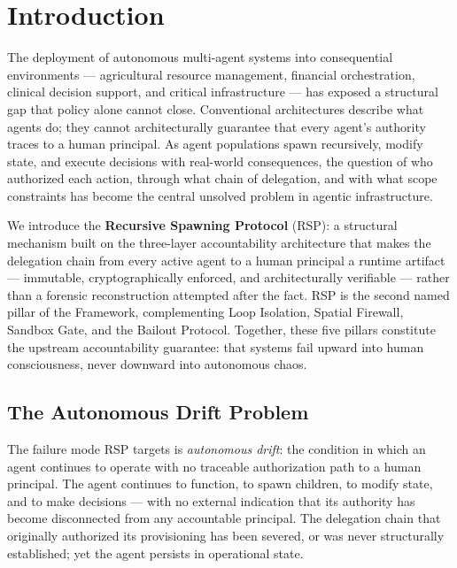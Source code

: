 \section{Introduction}
\label{sec:rs-intro}

The deployment of autonomous multi-agent systems into consequential environments — agricultural resource management, financial orchestration, clinical decision support, and critical infrastructure — has exposed a structural gap that policy alone cannot close. Conventional architectures describe what agents do; they cannot architecturally guarantee that every agent's authority traces to a human principal. As agent populations spawn recursively, modify state, and execute decisions with real-world consequences, the question of who authorized each action, through what chain of delegation, and with what scope constraints has become the central unsolved problem in agentic infrastructure.

We introduce the \textbf{Recursive Spawning Protocol} (RSP): a structural mechanism built on the \bxthree{} three-layer accountability architecture that makes the delegation chain from every active agent to a human principal a runtime artifact — immutable, cryptographically enforced, and architecturally verifiable — rather than a forensic reconstruction attempted after the fact. RSP is the second named pillar of the \bxthree{} Framework, complementing Loop Isolation, Spatial Firewall, Sandbox Gate, and the Bailout Protocol. Together, these five pillars constitute the upstream accountability guarantee: that \bxthree{} systems fail upward into human consciousness, never downward into autonomous chaos.

\subsection{The Autonomous Drift Problem}

The failure mode RSP targets is \emph{autonomous drift}: the condition in which an agent continues to operate with no traceable authorization path to a human principal. The agent continues to function, to spawn children, to modify state, and to make decisions — with no external indication that its authority has become disconnected from any accountable principal. The delegation chain that originally authorized its provisioning has been severed, or was never structurally established; yet the agent persists in operational state.

